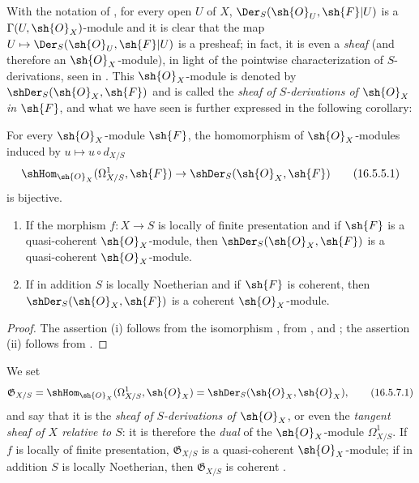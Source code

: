 \begin{env}[16.5.4]
\label{IV.16.5.4}
With the notation of , for every open $U$ of $X$, $\Der_S(\sh{O}_U, \sh{F}|U)$ is a $\Gamma(U, \sh{O}_X)$-module and it is clear that the map $U \mapsto \Der_S(\sh{O}_U, \sh{F}|U)$ is a presheaf;
in fact, it is even a \emph{sheaf} (and therefore an $\sh{O}_X$-module), in light of the pointwise characterization of $S$-derivations, seen in .
This $\sh{O}_X$-module is denoted by $\shDer_S(\sh{O}_X, \sh{F})$ and is called the \emph{sheaf of $S$-derivations of $\sh{O}_X$ in $\sh{F}$}, and what we have seen is further expressed in the following corollary:
\end{env}

\begin{corollary}[16.5.5]
\label{IV.16.5.5}
For every $\sh{O}_X$-module $\sh{F}$, the homomorphism of $\sh{O}_X$-modules induced by $u \mapsto u \circ d_{X/S}$
\[
\label{IV.16.5.5.1}
  \shHom_{\sh{O}_X}(\Omega_{X/S}^1, \sh{F}) \to \shDer_S(\sh{O}_X, \sh{F})
  \tag{16.5.5.1}
\]
is bijective.
\end{corollary}

\begin{corollary}[16.5.6]
\label{IV.16.5.6}
\begin{enumerate}
  \item[{\rm(i)}] If the morphism $f : X \to S$ is locally of finite presentation and if $\sh{F}$ is a quasi-coherent $\sh{O}_X$-module, then $\shDer_S(\sh{O}_X, \sh{F})$ is a quasi-coherent $\sh{O}_X$-module.
  \item[{\rm(ii)}] If in addition $S$ is locally Noetherian and if $\sh{F}$ is coherent, then $\shDer_S(\sh{O}_X, \sh{F})$ is a coherent $\sh{O}_X$-module.
\end{enumerate}
\end{corollary}

\begin{proof}
The assertion (i) follows from the isomorphism , from , and ;
the assertion (ii) follows from .
\end{proof}

\begin{env}[16.5.7]
\label{IV.16.5.7}
We set
\[
\label{IV.16.5.7.1}
  \mathfrak{G}_{X/S} = \shHom_{\sh{O}_X}(\Omega_{X/S}^1, \sh{O}_X) = \shDer_S(\sh{O}_X, \sh{O}_X),
  \tag{16.5.7.1}
\]
and say that it is the \emph{sheaf of $S$-derivations of $\sh{O}_X$}, or even the \emph{tangent sheaf of $X$ relative to $S$}:
it is therefore the \emph{dual} of the $\sh{O}_X$-module $\Omega_{X/S}^1$.
If $f$ is locally of finite presentation,
$\mathfrak{G}_{X/S}$ is a quasi-coherent $\sh{O}_X$-module;
if in addition $S$ is locally Noetherian, then $\mathfrak{G}_{X/S}$ is coherent .
\end{env}

